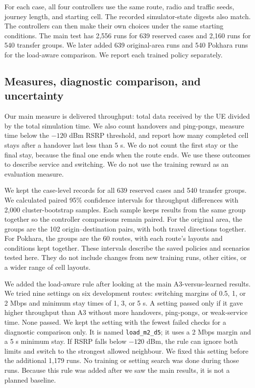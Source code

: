 \documentclass[fleqn,10pt,twoside]{IOEGC}
\begin{document}
For each case, all four controllers use the same route, radio and traffic seeds, journey length, and starting cell. The recorded simulator-state digests also match. The controllers can then make their own choices under the same starting conditions. The main test has 2,556 runs for 639 reserved cases and 2,160 runs for 540 transfer groups. We later added 639 original-area runs and 540 Pokhara runs for the load-aware comparison. We report each trained policy separately.

\subsection{Measures, diagnostic comparison, and uncertainty}
Our main measure is delivered throughput: total data received by the UE divided by the total simulation time. We also count handovers and ping-pongs, measure time below the $-120$ dBm RSRP threshold, and report how many completed cell stays after a handover last less than 5 s. We do not count the first stay or the final stay, because the final one ends when the route ends. We use these outcomes to describe service and switching. We do not use the training reward as an evaluation measure.

We kept the case-level records for all 639 reserved cases and 540 transfer groups. We calculated paired 95\% confidence intervals for throughput differences with 2,000 cluster-bootstrap samples. Each sample keeps results from the same group together so the controller comparisons remain paired. For the original area, the groups are the 102 origin--destination pairs, with both travel directions together. For Pokhara, the groups are the 60 routes, with each route's layouts and conditions kept together. These intervals describe the saved policies and scenarios tested here. They do not include changes from new training runs, other cities, or a wider range of cell layouts.

We added the load-aware rule after looking at the main A3-versus-learned results. We tried nine settings on six development routes: switching margins of 0.5, 1, or 2 Mbps and minimum stay times of 1, 3, or 5 s. A setting passed only if it gave higher throughput than A3 without more handovers, ping-pongs, or weak-service time. None passed. We kept the setting with the fewest failed checks for a diagnostic comparison only. It is named \texttt{load\_m2\_d5}; it uses a 2 Mbps margin and a 5 s minimum stay. If RSRP falls below $-120$ dBm, the rule can ignore both limits and switch to the strongest allowed neighbour. We fixed this setting before the additional 1,179 runs. No training or setting search was done during those runs. Because this rule was added after we saw the main results, it is not a planned baseline.
\end{document}
